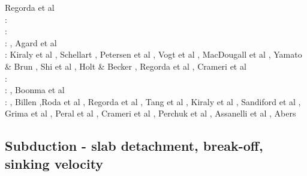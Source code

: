 \begin{scriptsize}
\cite{cavg13}\cite{vocg13}\cite{qula13}\cite{bugu13}\cite{myhi13}\cite{mesc13}\cite{cibi13}
\cite{scra13} Regorda et al \cite{rems13}\\
\twothousandfourteen: 
\cite{robn14}\cite{hond14}\cite{ronc14}\cite{mobm14}\cite{famc14}\cite{fogm14}\cite{frba14} 
\cite{gagd14}\cite{voge14}\cite{voge14b}\cite{lidr14}\cite{bocj04}\cite{bagb14}\cite{stjm14}
\cite{basc14}\cite{vamd14}\cite{kile14}\cite{jahm14}\cite{bufa14}\cite{bufy14b}\cite{chsv14}
\cite{chsg14}\cite{sigb14}\cite{shjm14}\cite{mova14}\cite{olpr14}\cite{paml14b}\cite{mafv14}\\
\twothousandfifteen: 
\cite{bemm15}\cite{bomv15}\cite{bogf15}\cite{ceag15}\cite{kifr15}\cite{vami15}\cite{dali15}
\cite{mami15}\cite{rula15}\cite{chsd15}\cite{dusc15}\cite{yotr15}\cite{cibi15}\cite{hobb15}
\cite{carr15}\\
\twothousandsixteen: 
\cite{tomy16}\cite{gukt16}\cite{robn16}\cite{mavm16}\cite{magc16}\cite{marl16}\cite{mesj16}
\cite{jada16}\cite{jada16b}\cite{liku16}\cite{chss16}, Agard et al \cite{agys16}\\
\twothousandseventeen: 
Kiraly et al \cite{kicf17}, Schellart \cite{sche17}, Petersen et al \cite{pest17},
Vogt et al \cite{vomc17}, MacDougall et al \cite{majf17}, Yamato \& Brun \cite{yabr17}, 
Shi et al \cite{shwl17}, Holt \& Becker \cite{hobe17}, Regorda et al \cite{rerm17},
Crameri et al \cite{crlt17}\\
\twothousandeighteen: 
\cite{yamz18}\cite{crli18}\cite{spcv18}\cite{chss18}\cite{yagz18}\cite{mazh18}\cite{pukp18}
\cite{masg18}\cite{biar18}\\
\twothousandnineteen:
\cite{magn19}\cite{mavb19}\cite{scvm19}\cite{cakc19}\cite{samo19}\cite{sihf19}\cite{meag19}
\cite{vaws19}, Boonma et al \cite{bokg19}\cite{vawg19}\cite{cibi19}\cite{pust19}\\
\twothousandtwenty:
\cite{algg20}\cite{braf20}\cite{vamg20}\cite{dawl20}\cite{meag20}\cite{bedh20}\cite{heyg20}
\cite{kicd20}\cite{mugu20}\cite{gatt20}\cite{pust20}, Billen \cite{bill20},Roda et al \cite{rozr20}, Regorda et al \cite{relr20}, Tang et al \cite{tacm20}, Kiraly et al \cite{kiph20}, Sandiford et al \cite{sams20}, Grima et al \cite{grlc20}, Peral et al \cite{perz20}, Crameri et al \cite{crmd20}, Perchuk et al \cite{pegz20}, Assanelli et al \cite{aslr20}, Abers \etal \cite{abvw20} 
\end{scriptsize}

\subsection{Subduction - slab detachment, break-off, sinking velocity}

